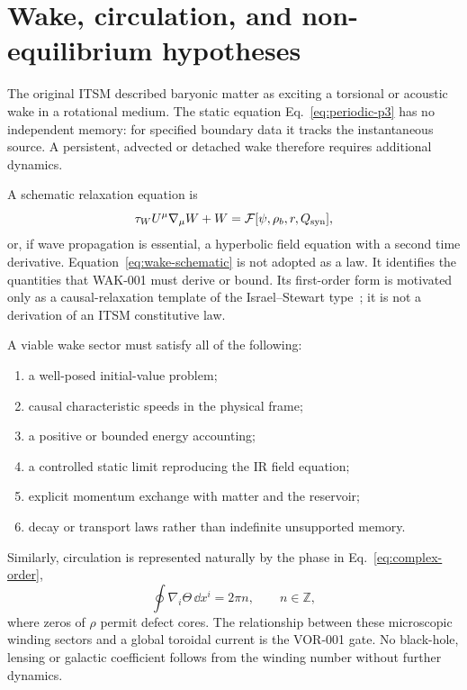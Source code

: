 \section{Wake, circulation, and non-equilibrium hypotheses}

The original ITSM described baryonic matter as exciting a torsional or
acoustic wake in a rotational medium.  The static equation
Eq.~\eqref{eq:periodic-p3} has no independent memory: for specified boundary
data it tracks the instantaneous source.  A persistent, advected or detached
wake therefore requires additional dynamics.

A schematic relaxation equation is
\begin{equation}
 \tau_W U^\mu\nabla_\mu W+W
 =\mathcal F[\psi,\rho_b,r,Q_{\rm syn}],
 \label{eq:wake-schematic}
\end{equation}
or, if wave propagation is essential, a hyperbolic field equation with a
second time derivative.  Equation~\eqref{eq:wake-schematic} is not adopted as a
law.  It identifies the quantities that WAK-001 must derive or bound.
Its first-order form is motivated only as a causal-relaxation template of the
Israel--Stewart type~\cite{israelstewart1979}; it is not a derivation of an
ITSM constitutive law.

A viable wake sector must satisfy all of the following:
\begin{enumerate}
\item a well-posed initial-value problem;
\item causal characteristic speeds in the physical frame;
\item a positive or bounded energy accounting;
\item a controlled static limit reproducing the IR field equation;
\item explicit momentum exchange with matter and the reservoir;
\item decay or transport laws rather than indefinite unsupported memory.
\end{enumerate}

Similarly, circulation is represented naturally by the phase in
Eq.~\eqref{eq:complex-order},
\begin{equation}
 \oint \nabla_i\Theta\,\dd x^i=2\pi n,
 \qquad n\in\mathbb Z,
\end{equation}
where zeros of $\rho$ permit defect cores.  The relationship between these
microscopic winding sectors and a global toroidal current is the VOR-001 gate.
No black-hole, lensing or galactic coefficient follows from the winding number
without further dynamics.

